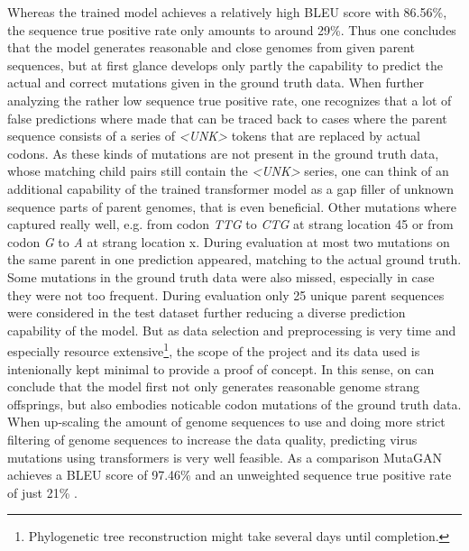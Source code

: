 Whereas the trained model achieves a relatively high \ac{BLEU} score with 86.56\%, the sequence true positive rate only amounts to around 29\%. Thus one concludes that the model generates reasonable and close genomes from given parent sequences, but at first glance develops only partly the capability to predict the actual and correct mutations given in the ground truth data. When further analyzing the rather low sequence true positive rate, one recognizes that a lot of false predictions where made that can be traced back to cases where the parent sequence consists of a series of \textit{<UNK>} tokens that are replaced by actual codons. As these kinds of mutations are not present in the ground truth data, whose matching child pairs still contain the \textit{<UNK>} series, one can think of an additional capability of the trained transformer model as a gap filler of unknown sequence parts of parent genomes, that is even beneficial. Other mutations where captured really well, e.g. from codon \textit{TTG} to \textit{CTG} at strang location 45 or from codon \textit{G} to \textit{A} at strang location x. During evaluation at most two mutations on the same parent in one prediction appeared, matching to the actual ground truth. Some mutations in the ground truth data were also missed, especially in case they were not too frequent. During evaluation only 25 unique parent sequences were considered in the test dataset further reducing a diverse prediction capability of the model. But as data selection and preprocessing is very time and especially resource extensive\footnote{Phylogenetic tree reconstruction might take several days until completion.}, the scope of the project and its data used is intenionally kept minimal to provide a proof of concept. In this sense, on can conclude that the model first not only generates reasonable genome strang offsprings, but also embodies noticable codon mutations of the ground truth data. When up-scaling the amount of genome sequences to use and doing more strict filtering of genome sequences to increase the data quality, predicting virus mutations using transformers is very well feasible. As a comparison MutaGAN achieves a \ac{BLEU} score of 97.46\% and an unweighted sequence true positive rate of just 21\% \cite{Berman2020}. 
 
\newpage
